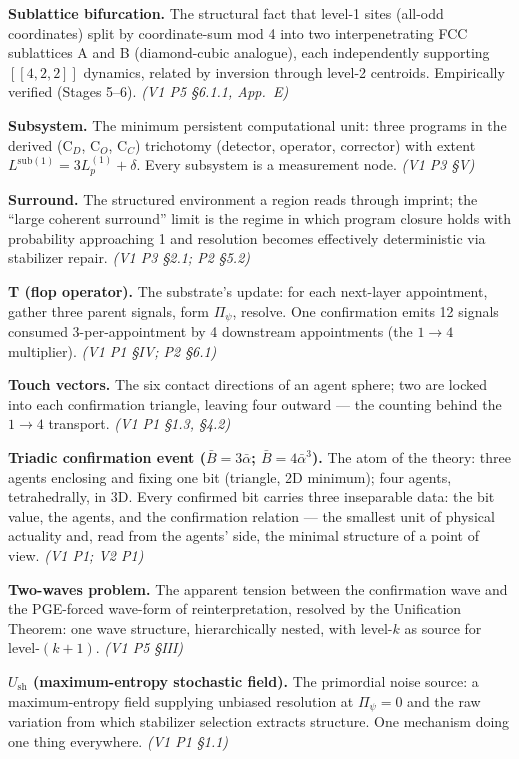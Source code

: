 \documentclass[11pt,oneside]{report}
\theoremstyle{definition}
\theoremstyle{remark}
\begin{document}
\textbf{Sublattice bifurcation.} The structural fact that level-1 sites (all-odd coordinates) split by coordinate-sum mod 4 into two interpenetrating FCC sublattices A and B (diamond-cubic analogue), each independently supporting $[[4,2,2]]$ dynamics, related by inversion through level-2 centroids. Empirically verified (Stages 5--6). \emph{(V1 P5 \S 6.1.1, App.\ E)}

\textbf{Subsystem.} The minimum persistent computational unit: three programs in the derived (C$_D$, C$_O$, C$_C$) trichotomy (detector, operator, corrector) with extent $L^{\mathrm{sub}(1)} = 3L_p^{(1)} + \delta$. Every subsystem is a measurement node. \emph{(V1 P3 \S V)}

\textbf{Surround.} The structured environment a region reads through imprint; the ``large coherent surround'' limit is the regime in which program closure holds with probability approaching 1 and resolution becomes effectively deterministic via stabilizer repair. \emph{(V1 P3 \S 2.1; P2 \S 5.2)}

\textbf{T (flop operator).} The substrate's update: for each next-layer appointment, gather three parent signals, form $\Pi_\psi$, resolve. One confirmation emits 12 signals consumed 3-per-appointment by 4 downstream appointments (the $1\to4$ multiplier). \emph{(V1 P1 \S IV; P2 \S 6.1)}

\textbf{Touch vectors.} The six contact directions of an agent sphere; two are locked into each confirmation triangle, leaving four outward --- the counting behind the $1\to4$ transport. \emph{(V1 P1 \S 1.3, \S 4.2)}

\textbf{Triadic confirmation event ($\bar{B}=3\bar{\alpha}$; $\bar{B}=4\bar{\alpha}^3$).} The atom of the theory: three agents enclosing and fixing one bit (triangle, 2D minimum); four agents, tetrahedrally, in 3D. Every confirmed bit carries three inseparable data: the bit value, the agents, and the confirmation relation --- the smallest unit of physical actuality and, read from the agents' side, the minimal structure of a point of view. \emph{(V1 P1; V2 P1)}

\textbf{Two-waves problem.} The apparent tension between the confirmation wave and the PGE-forced wave-form of reinterpretation, resolved by the Unification Theorem: one wave structure, hierarchically nested, with level-$k$ as source for level-$(k{+}1)$. \emph{(V1 P5 \S III)}

\textbf{$U_{\mathrm{sh}}$ (maximum-entropy stochastic field).} The primordial noise source: a maximum-entropy field supplying unbiased resolution at $\Pi_\psi = 0$ and the raw variation from which stabilizer selection extracts structure. One mechanism doing one thing everywhere. \emph{(V1 P1 \S 1.1)}
\end{document}
